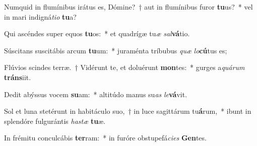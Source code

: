 \item Numquid in flumínibus irátus es, Dómine?~† aut in flumínibus furor \textbf{tu}us?~* vel in mari indigná\textit{ti}\textit{o} \textbf{tu}a?
\item Qui ascéndes super equos \textbf{tu}os:~* et quadrígæ tu\textit{æ} \textit{sal}\textbf{vá}tio.
\item Súscitans suscitábis arcum \textbf{tu}um:~* juraménta tríbubus \textit{quæ} \textit{lo}\textbf{cú}tus es;
\item Flúvios scindes terræ.~† Vidérunt te, et doluérunt \textbf{mon}tes:~* gurges a\textit{quá}\textit{rum} \textbf{tráns}iit.
\item Dedit abýssus vocem \textbf{su}am:~* altitúdo manus su\textit{as} \textit{le}\textbf{vá}vit.
\item Sol et luna stetérunt in habitáculo suo,~† in luce sagittárum tu\textbf{á}rum,~* ibunt in splendóre fulgurántis \textit{has}\textit{tæ} \textbf{tu}æ.
\item In frémitu conculcábis \textbf{ter}ram:~* in furóre obstupefá\textit{ci}\textit{es} \textbf{Gen}tes.
